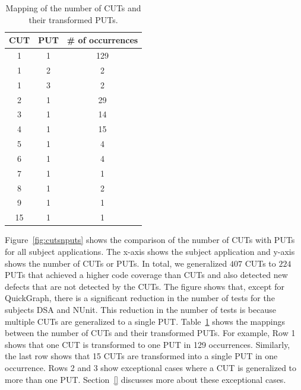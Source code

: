 \begin{table}[t]
\begin{CodeOut}
\begin{center}
\centering \caption {\label{tab:cutputmapping} Mapping of the number of CUTs and their transformed PUTs.}
\begin {tabular} {|c|c|c|}
\hline \textbf{CUT} & \textbf{PUT} & \textbf{\# of occurrences}\\
\hline
\hline 1   & 1   & 129\\
\hline 1   & 2   & 2\\
\hline 1   & 3   & 2\\
\hline 2   & 1   & 29\\
\hline 3   & 1   & 14\\
\hline 4   & 1   & 15\\
\hline 5   & 1   & 4\\
\hline 6   & 1   & 4\\
\hline 7   & 1   & 1\\
\hline 8   & 1   & 2\\
\hline 9   & 1   & 1\\
\hline 15   & 1   & 1\\
\hline
\end{tabular}\vspace*{-3ex}
\end{center}
\end{CodeOut}
\end{table}

Figure~\ref{fig:cutsnputs} shows the comparison of the number of CUTs with PUTs for all subject applications. The x-axis shows the subject application and y-axis shows the number of CUTs or PUTs. In total, we generalized $407$ CUTs to $224$ PUTs that achieved a higher code coverage than CUTs and also detected new defects that are not detected by the CUTs. The figure shows that, except for QuickGraph, there is a significant reduction in the number of tests for the subjects DSA and NUnit. This reduction in the number of tests is because multiple CUTs are generalized to a single PUT. Table~\ref{tab:cutputmapping} shows the mappings between the number of CUTs and their transformed PUTs. For example, Row 1 shows that one CUT is transformed to one PUT in 129 occurrences. Similarly, the last row shows that 15 CUTs are transformed into a single PUT in one occurrence. Rows 2 and 3 show exceptional cases where a CUT is generalized to more than one PUT. Section~\ref{} discusses more about these exceptional cases. 

